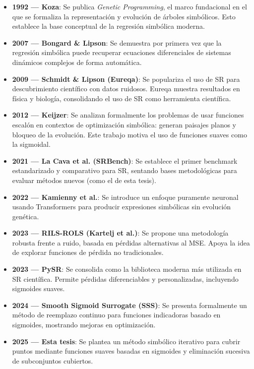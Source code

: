 \documentclass[12pt,a4paper]{article}
\begin{document}
\begin{itemize}
    \item \textbf{1992 — Koza}: Se publica \textit{Genetic Programming}, el marco fundacional en el que se formaliza la representación y evolución de árboles simbólicos. Esto establece la base conceptual de la regresión simbólica moderna.

    \item \textbf{2007 — Bongard \& Lipson}: Se demuestra por primera vez que la regresión simbólica puede recuperar ecuaciones diferenciales de sistemas dinámicos complejos de forma automática.

    \item \textbf{2009 — Schmidt \& Lipson (Eureqa)}: Se populariza el uso de SR para descubrimiento científico con datos ruidosos. Eureqa muestra resultados en física y biología, consolidando el uso de SR como herramienta científica.

    \item \textbf{2012 — Keijzer}: Se analizan formalmente los problemas de usar funciones escalón en contextos de optimización simbólica: generan paisajes planos y bloqueo de la evolución. Este trabajo motiva el uso de funciones suaves como la sigmoidal.

    \item \textbf{2021 — La Cava et al. (SRBench)}: Se establece el primer benchmark estandarizado y comparativo para SR, sentando bases metodológicas para evaluar métodos nuevos (como el de esta tesis).

    \item \textbf{2022 — Kamienny et al.}: Se introduce un enfoque puramente neuronal usando Transformers para producir expresiones simbólicas sin evolución genética.

    \item \textbf{2023 — RILS-ROLS (Kartelj et al.)}: Se propone una metodología robusta frente a ruido, basada en pérdidas alternativas al MSE. Apoya la idea de explorar funciones de pérdida no tradicionales.

    \item \textbf{2023 — PySR}: Se consolida como la biblioteca moderna más utilizada en SR científica. Permite pérdidas diferenciables y personalizadas, incluyendo sigmoides suaves.

    \item \textbf{2024 — Smooth Sigmoid Surrogate (SSS)}: Se presenta formalmente un método de reemplazo continuo para funciones indicadoras basado en sigmoides, mostrando mejoras en optimización.

    \item \textbf{2025 — Esta tesis}: Se plantea un método simbólico iterativo para cubrir puntos mediante funciones suaves basadas en sigmoides y eliminación sucesiva de subconjuntos cubiertos.
\end{itemize}
\end{document}
